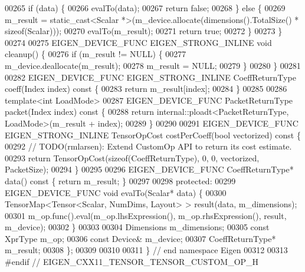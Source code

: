 \begin{DoxyCode}
00265     \textcolor{keywordflow}{if} (data) \{
00266       evalTo(data);
00267       \textcolor{keywordflow}{return} \textcolor{keyword}{false};
00268     \} \textcolor{keywordflow}{else} \{
00269       m\_result = \textcolor{keyword}{static\_cast<}Scalar *\textcolor{keyword}{>}(m\_device.allocate(dimensions().TotalSize() * \textcolor{keyword}{sizeof}(Scalar)));
00270       evalTo(m\_result);
00271       \textcolor{keywordflow}{return} \textcolor{keyword}{true};
00272     \}
00273   \}
00274 
00275   EIGEN\_DEVICE\_FUNC EIGEN\_STRONG\_INLINE \textcolor{keywordtype}{void} cleanup() \{
00276     \textcolor{keywordflow}{if} (m\_result != NULL) \{
00277       m\_device.deallocate(m\_result);
00278       m\_result = NULL;
00279     \}
00280   \}
00281 
00282   EIGEN\_DEVICE\_FUNC EIGEN\_STRONG\_INLINE CoeffReturnType coeff(Index index)\textcolor{keyword}{ const }\{
00283     \textcolor{keywordflow}{return} m\_result[index];
00284   \}
00285 
00286   \textcolor{keyword}{template}<\textcolor{keywordtype}{int} LoadMode>
00287   EIGEN\_DEVICE\_FUNC PacketReturnType packet(Index index)\textcolor{keyword}{ const }\{
00288     \textcolor{keywordflow}{return} internal::ploadt<PacketReturnType, LoadMode>(m\_result + index);
00289   \}
00290 
00291   EIGEN\_DEVICE\_FUNC EIGEN\_STRONG\_INLINE TensorOpCost costPerCoeff(\textcolor{keywordtype}{bool} vectorized)\textcolor{keyword}{ const }\{
00292     \textcolor{comment}{// TODO(rmlarsen): Extend CustomOp API to return its cost estimate.}
00293     \textcolor{keywordflow}{return} TensorOpCost(\textcolor{keyword}{sizeof}(CoeffReturnType), 0, 0, vectorized, PacketSize);
00294   \}
00295 
00296   EIGEN\_DEVICE\_FUNC CoeffReturnType* data()\textcolor{keyword}{ const }\{ \textcolor{keywordflow}{return} m\_result; \}
00297 
00298  \textcolor{keyword}{protected}:
00299   EIGEN\_DEVICE\_FUNC \textcolor{keywordtype}{void} evalTo(Scalar* data) \{
00300     TensorMap<Tensor<Scalar, NumDims, Layout> > result(data, m\_dimensions);
00301     m\_op.func().eval(m\_op.lhsExpression(), m\_op.rhsExpression(), result, m\_device);
00302   \}
00303 
00304   Dimensions m\_dimensions;
00305   \textcolor{keyword}{const} XprType m\_op;
00306   \textcolor{keyword}{const} Device& m\_device;
00307   CoeffReturnType* m\_result;
00308 \};
00309 
00310 
00311 \} \textcolor{comment}{// end namespace Eigen}
00312 
00313 \textcolor{preprocessor}{#endif // EIGEN\_CXX11\_TENSOR\_TENSOR\_CUSTOM\_OP\_H}
\end{DoxyCode}
